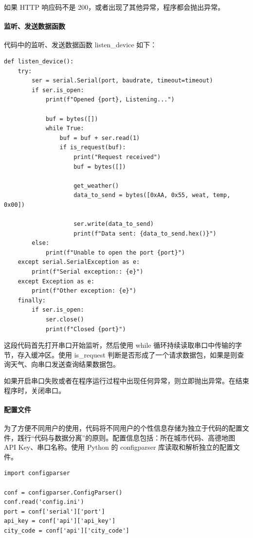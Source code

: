 \documentclass{article}
\begin{document}
如果 HTTP 响应码不是 200，或者出现了其他异常，程序都会抛出异常。

\paragraph{监听、发送数据函数}

代码中的监听、发送数据函数 listen\_device 如下：

\begin{verbatim}
def listen_device():
    try:
        ser = serial.Serial(port, baudrate, timeout=timeout)
        if ser.is_open:
            print(f"Opened {port}, Listening...")

            buf = bytes([])
            while True:
                buf = buf + ser.read(1)
                if is_request(buf):
                    print("Request received")
                    buf = bytes([])

                    get_weather()
                    data_to_send = bytes([0xAA, 0x55, weat, temp, 0x00])

                    ser.write(data_to_send)
                    print(f"Data sent: {data_to_send.hex()}")
        else:
            print(f"Unable to open the port {port}")
    except serial.SerialException as e:
        print(f"Serial exception:: {e}")
    except Exception as e:
        print(f"Other exception: {e}")
    finally:
        if ser.is_open:
            ser.close()
            print(f"Closed {port}")
\end{verbatim}

这段代码首先打开串口开始监听，然后使用 while 循环持续读取串口中传输的字节，存入缓冲区。使用 is\_request 判断是否形成了一个请求数据包，如果是则查询天气、向串口发送查询结果数据包。

如果开启串口失败或者在程序运行过程中出现任何异常，则立即抛出异常。在结束程序时，关闭串口。

\paragraph{配置文件} 为了方便不同用户的使用，代码将不同用户的个性信息存储为独立于代码的配置文件，践行“代码与数据分离”的原则。配置信息包括：所在城市代码、高德地图 API Key、串口名称。使用 Python 的 configparser 库读取和解析独立的配置文件。

\begin{verbatim}
import configparser

conf = configparser.ConfigParser()
conf.read('config.ini')
port = conf['serial']['port']
api_key = conf['api']['api_key']
city_code = conf['api']['city_code']
\end{verbatim}
\end{document}
